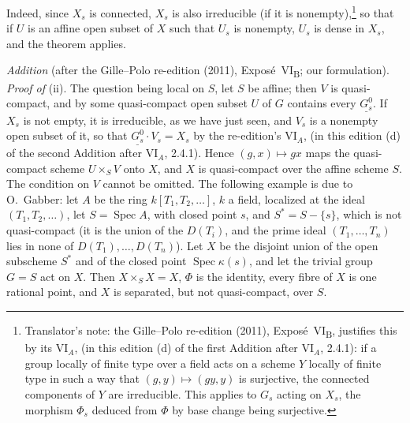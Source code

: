 Indeed, since \(X_s\) is connected, \(X_s\) is also irreducible (if it is nonempty),\footnote{Translator's
note: the Gille--Polo re-edition (2011), Expos\'e~VI\textsubscript{B}, justifies this by its VI\(_A\),  (in
this edition (d) of the first Addition after VI\(_A\), 2.4.1): if a group
locally of finite type over a field acts on a scheme \(Y\) locally of finite type in such a way that
\((g,y)\mapsto(gy,y)\) is surjective, the connected components of \(Y\) are irreducible. This applies to
\(G_s\) acting on \(X_s\), the morphism \(\Phi_s\) deduced from \(\Phi\) by base change being surjective.} so
that if \(U\) is an affine open subset of \(X\) such that \(U_s\) is nonempty, \(U_s\) is dense in \(X_s\), and
the theorem applies.

\par\medskip\noindent
\emph{Addition} (after the Gille--Polo re-edition (2011), Expos\'e~VI\textsubscript{B}; our formulation).
\emph{Proof of} (ii). The question being local on \(S\), let \(S\) be affine; then \(V\) is quasi-compact, and
by  some quasi-compact open subset \(U\) of \(G\) contains every
\(\underline{G^0_s}\). If \(X_s\) is not empty, it is irreducible, as we have just seen, and \(V_s\) is a
nonempty open subset of it, so that \(\underline{G^0_s}\cdot V_s=X_s\) by the re-edition's
VI\(_A\),  (in this edition (d) of the second Addition after
VI\(_A\), 2.4.1). Hence
\((g,x)\mapsto gx\) maps the quasi-compact scheme \(U\times_SV\) onto \(X\), and \(X\) is quasi-compact over the
affine scheme \(S\). The condition on \(V\) cannot be omitted. The following example is due to O.~Gabber: let
\(A\) be the ring \(k[T_1,T_2,\ldots]\), \(k\) a field, localized at the ideal \((T_1,T_2,\ldots)\), let
\(S=\operatorname{Spec}A\), with closed point \(s\), and \(S^*=S-\{s\}\), which is not quasi-compact (it is the
union of the \(D(T_i)\), and the prime ideal \((T_1,\ldots,T_n)\) lies in none of \(D(T_1),\ldots,D(T_n)\)). Let
\(X\) be the disjoint union of the open subscheme \(S^*\) and of the closed point \(\operatorname{Spec}\kappa(s)\),
and let the trivial group \(G=S\) act on \(X\). Then \(X\times_SX=X\), \(\Phi\) is the identity, every fibre of
\(X\) is one rational point, and \(X\) is separated, but not quasi-compact, over \(S\).

